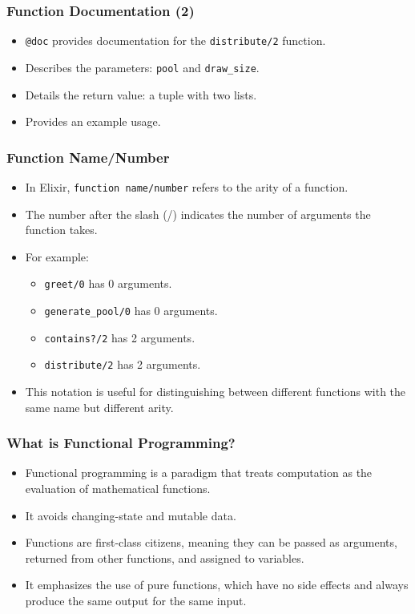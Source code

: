 \documentclass[aspectratio=169, table]{beamer}
\begin{document}
	\begin{frame}[fragile]
		\frametitle{Function Documentation (2)}
		\begin{itemize}
			\item \texttt{@doc} provides documentation for the \texttt{distribute/2} function.
			\item Describes the parameters: \texttt{pool} and \texttt{draw\_size}.
			\item Details the return value: a tuple with two lists.
			\item Provides an example usage.
		\end{itemize}
	\end{frame}

	\begin{frame}
		\frametitle{Function Name/Number}
		\begin{itemize}
			\item In Elixir, \texttt{function name/number} refers to the arity of a function.
			\item The number after the slash (/) indicates the number of arguments the function takes.
			\item For example:
			\begin{itemize}
				\item \texttt{greet/0} has 0 arguments.
				\item \texttt{generate\_pool/0} has 0 arguments.
				\item \texttt{contains?/2} has 2 arguments.
				\item \texttt{distribute/2} has 2 arguments.
			\end{itemize}
			\item This notation is useful for distinguishing between different functions with the same name but different arity.
		\end{itemize}
	\end{frame}


\begin{frame}
	\frametitle{What is Functional Programming?}
	\begin{itemize}
		\item Functional programming is a paradigm that treats computation as the evaluation of mathematical functions.
		\item It avoids changing-state and mutable data.
		\item Functions are first-class citizens, meaning they can be passed as arguments, returned from other functions, and assigned to variables.
		\item It emphasizes the use of pure functions, which have no side effects and always produce the same output for the same input.
	\end{itemize}
\end{frame}
\end{document}
